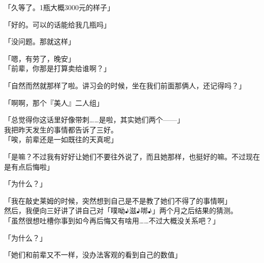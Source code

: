 「久等了。1瓶大概3000元的样子」

「好的。可以的话能给我几瓶吗」

「没问题。那就这样」

「嗯，有劳了，晚安」\\

「前辈，你那是打算卖给谁啊？」

「自然而然就那样了啦。讲习会的时候，坐在我们前面那俩人，还记得吗？」

「啊啊，那个『美人』二人组」

「总觉得你这话里好像带刺……是啦，其实她们两个——」\\

我把昨天发生的事情都告诉了三好。\\

「唉，前辈还是一如既往的天真呢」

「是嘛？不过我有好好让她们不要往外说了，而且她那样，也挺好的嘛。不过现在是有点后悔啦」

「为什么？」

「我在敲史莱姆的时候，突然想到自己是不是教了她们不得了的事情啊」\\

然后，我便向三好讲了讲自己对「噗呦♪滋♪𠳐♪」两个月之后结果的猜测。\\

「虽然很想吐槽你事到如今再后悔又有啥用……不过大概没关系吧？」

「为什么？」

「她们和前辈又不一样，没办法客观的看到自己的数值」

